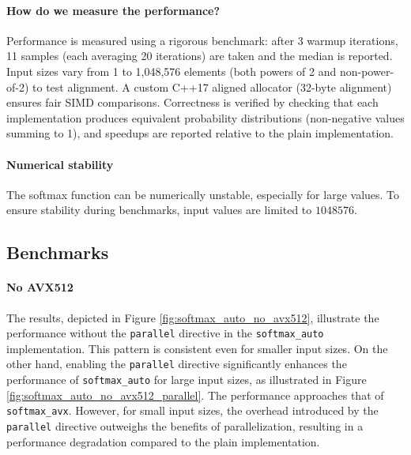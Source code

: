 \documentclass[10pt]{article}
\begin{document}
\paragraph{How do we measure the performance?}
Performance is measured using a rigorous benchmark: after 3 warmup iterations, 11 samples (each averaging 20 iterations) are taken and the median is reported. Input sizes vary from 1 to 1,048,576 elements (both powers of 2 and non-power-of-2) to test alignment. A custom C++17 aligned allocator (32-byte alignment) ensures fair SIMD comparisons. Correctness is verified by checking that each implementation produces equivalent probability distributions (non-negative values summing to 1), and speedups are reported relative to the plain implementation.

\paragraph{Numerical stability} The softmax function can be numerically unstable, especially for large values. To ensure stability during benchmarks, input values are limited to $1048576$.

\subsection{Benchmarks}
\paragraph{No AVX512} The results, depicted in Figure \ref{fig:softmax_auto_no_avx512}, illustrate the performance without the \texttt{parallel} directive in the \texttt{softmax\_auto} implementation. This pattern is consistent even for smaller input sizes. On the other hand, enabling the \texttt{parallel} directive significantly enhances the performance of \texttt{softmax\_auto} for large input sizes, as illustrated in Figure \ref{fig:softmax_auto_no_avx512_parallel}. The performance approaches that of \texttt{softmax\_avx}. However, for small input sizes, the overhead introduced by the \texttt{parallel} directive outweighs the benefits of parallelization, resulting in a performance degradation compared to the plain implementation.
\end{document}
